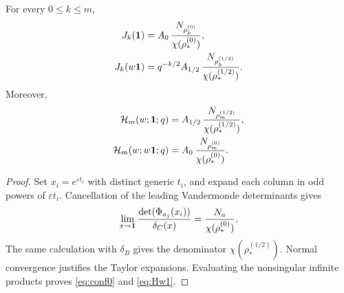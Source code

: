 \begin{lemma}\label{lem:confluent}
For every $0\le k\le m$,
\begin{align}
J_k(\mathbf{1})&=A_0\,\frac{N_{\rho^{(0)}_k}}{\chi(\rho^{(0)}_*)},\label{eq:conf0}\\
J_k(w\mathbf{1})&=q^{-k/2}A_{1/2}\,\frac{N_{\rho^{(1/2)}_k}}{\chi(\rho^{(1/2)}_*)}.\label{eq:confhalf}
\end{align}
Moreover,
\begin{align}
\mathcal{H}_m(w;\mathbf{1};q)&=A_{1/2}\,\frac{N_{\rho^{(1/2)}_m}}{\chi(\rho^{(1/2)}_*)},\label{eq:Hw1}\\
\mathcal{H}_m(w;w\mathbf{1};q)&=A_0\,\frac{N_{\rho^{(0)}_m}}{\chi(\rho^{(0)}_*)}.\label{eq:Hww}
\end{align}
\end{lemma}

\begin{proof}
Set $x_i=e^{\varepsilon t_i}$ with distinct generic $t_i$, and expand each column in odd powers of $\varepsilon t_i$. Cancellation of the leading Vandermonde determinants gives
\[
\lim_{x\to\mathbf{1}}\frac{\det(\Phi_{a_j}(x_i))}{\delta_C(x)}=\frac{N_a}{\chi(\rho^{(0)}_*)}.
\]
The same calculation with $\delta_B$ gives the denominator $\chi(\rho^{(1/2)}_*)$. Normal convergence justifies the Taylor expansions. Evaluating the nonsingular infinite products proves \eqref{eq:conf0} and \eqref{eq:Hw1}.


\end{proof}
